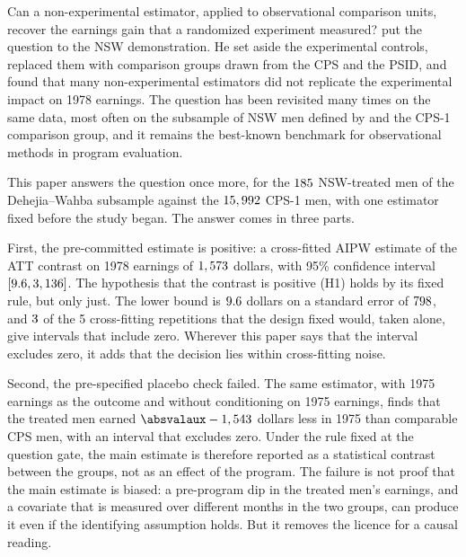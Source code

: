 \documentclass[11pt]{article}
\def\absvalaux-#1\relax{#1}
\newcommand{\absval}[1]{\expandafter\absvalaux#1\relax}
\newcommand{\ci}[2]{$[#1, #2]$}
\begin{document}
Can a non-experimental estimator, applied to observational comparison units, recover the
earnings gain that a randomized experiment measured? \citet{lalonde1986} put the question to
the NSW demonstration. He set aside the experimental controls, replaced them with comparison
groups drawn from the CPS and the PSID, and found that many non-experimental estimators did
not replicate the experimental impact on 1978 earnings. The question has been revisited many
times on the same data, most often on the subsample of NSW men defined by
\citet{dehejia1999} and the CPS-1 comparison group, and it remains the best-known benchmark
for observational methods in program evaluation.

This paper answers the question once more, for the $185$ NSW-treated men of the
Dehejia--Wahba subsample against the $15,992$ CPS-1 men, with one estimator fixed
before the study began. The answer comes in three parts.

First, the pre-committed estimate is positive: a cross-fitted AIPW estimate of the ATT
contrast on 1978 earnings of $1,573$ dollars, with 95\% confidence interval
\ci{\PrimaryCiLow}{\PrimaryCiHigh}. The hypothesis that the contrast is positive (H1) holds
by its fixed rule, but only just. The lower bound is $9.6$ dollars on a standard
error of $798$, and $3$ of the 5 cross-fitting repetitions
that the design fixed would, taken alone, give intervals that include zero. Wherever this
paper says that the interval excludes zero, it adds that the decision lies within
cross-fitting noise.

Second, the pre-specified placebo check failed. The same estimator, with 1975 earnings as
the outcome and without conditioning on 1975 earnings, finds that the treated men earned
$\absval{\PlaceboEffect}$ dollars less in 1975 than comparable CPS men, with an interval
that excludes zero. Under the rule fixed at the question gate, the main estimate is
therefore reported as a statistical contrast between the groups, not as an effect of the
program. The failure is not proof that the main estimate is biased: a pre-program dip in
the treated men's earnings, and a covariate that is measured over different months in the
two groups, can produce it even if the identifying assumption holds. But it removes the
licence for a causal reading.
\end{document}
